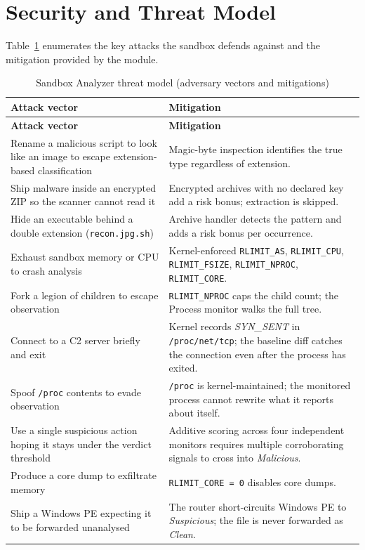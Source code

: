\documentclass[12pt, a4paper]{report}
\begin{document}
\section{Security and Threat Model}

Table~\ref{tab:sb_threats} enumerates the key attacks the sandbox
defends against and the mitigation provided by the module.

\begin{longtable}{|p{6cm}|p{8cm}|}
\caption{Sandbox Analyzer threat model (adversary vectors and mitigations)}
\label{tab:sb_threats}\\
\hline
\textbf{Attack vector} & \textbf{Mitigation} \\
\hline
\endfirsthead

\hline
\textbf{Attack vector} & \textbf{Mitigation} \\
\hline
\endhead

Rename a malicious script to look like an image to escape extension-based classification & Magic-byte inspection identifies the true type regardless of extension. \\
\hline
Ship malware inside an encrypted ZIP so the scanner cannot read it & Encrypted archives with no declared key add a risk bonus; extraction is skipped. \\
\hline
Hide an executable behind a double extension (\texttt{recon.jpg.sh}) & Archive handler detects the pattern and adds a risk bonus per occurrence. \\
\hline
Exhaust sandbox memory or CPU to crash analysis & Kernel-enforced \texttt{RLIMIT\_AS}, \texttt{RLIMIT\_CPU}, \texttt{RLIMIT\_FSIZE}, \texttt{RLIMIT\_NPROC}, \texttt{RLIMIT\_CORE}. \\
\hline
Fork a legion of children to escape observation & \texttt{RLIMIT\_NPROC} caps the child count; the Process monitor walks the full tree. \\
\hline
Connect to a C2 server briefly and exit & Kernel records \emph{SYN\_SENT} in \texttt{/proc/net/tcp}; the baseline diff catches the connection even after the process has exited. \\
\hline
Spoof \texttt{/proc} contents to evade observation & \texttt{/proc} is kernel-maintained; the monitored process cannot rewrite what it reports about itself. \\
\hline
Use a single suspicious action hoping it stays under the verdict threshold & Additive scoring across four independent monitors requires multiple corroborating signals to cross into \emph{Malicious}. \\
\hline
Produce a core dump to exfiltrate memory & \texttt{RLIMIT\_CORE = 0} disables core dumps. \\
\hline
Ship a Windows PE expecting it to be forwarded unanalysed & The router short-circuits Windows PE to \emph{Suspicious}; the file is never forwarded as \emph{Clean}. \\
\hline
\end{longtable}
\end{document}
